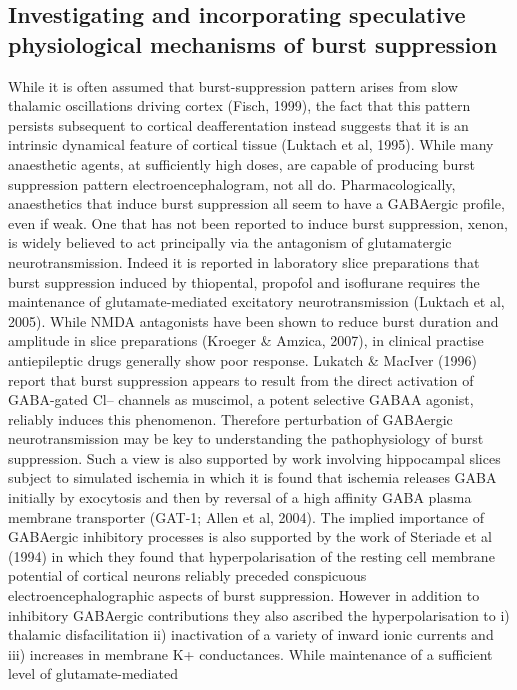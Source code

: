 \documentclass[a4paper,12pt]{article}
\begin{document}
\subsection{Investigating and incorporating speculative physiological
mechanisms of burst suppression}
While it is often assumed that burst-suppression pattern arises from
slow thalamic oscillations driving cortex (Fisch, 1999), the fact that
this pattern persists subsequent to cortical deafferentation instead
suggests that it is an intrinsic dynamical feature of cortical tissue
(Luktach et al, 1995).
While many anaesthetic agents, at sufficiently high doses, are capable
of producing burst suppression pattern electroencephalogram, not all
do. Pharmacologically, anaesthetics that induce burst suppression all
seem to have a GABAergic profile, even if weak. One that has not
been reported to induce burst suppression, xenon, is widely believed to
act principally via the antagonism of glutamatergic neurotransmission.
Indeed it is reported in laboratory slice preparations that burst
suppression induced by thiopental, propofol and isoflurane requires the
maintenance of glutamate-mediated excitatory neurotransmission
(Luktach et al, 2005). While NMDA antagonists have been shown to
reduce burst duration and amplitude in slice preparations (Kroeger \&
Amzica, 2007), in clinical practise antiepileptic drugs generally show
poor response.
Lukatch \& MacIver (1996) report that burst suppression appears to
result from the direct activation of GABA-gated Cl– channels as
muscimol, a potent selective GABAA agonist, reliably induces this
phenomenon. Therefore perturbation of GABAergic neurotransmission
may be key to understanding the pathophysiology of burst
suppression. Such a view is also supported by work involving
hippocampal slices subject to simulated ischemia in which it is found
that ischemia releases GABA initially by exocytosis and then by
reversal of a high affinity GABA plasma membrane transporter (GAT-1;
Allen et al, 2004).
The implied importance of GABAergic inhibitory processes is also
supported by the work of Steriade et al (1994) in which they found
that hyperpolarisation of the resting cell membrane potential of
cortical neurons reliably preceded conspicuous electroencephalographic
aspects of burst suppression. However in addition to inhibitory
GABAergic contributions they also ascribed the hyperpolarisation to i)
thalamic disfacilitation ii) inactivation of a variety of inward ionic
currents and iii) increases in membrane K+ conductances.
While maintenance of a sufficient level of glutamate-mediated
\end{document}

